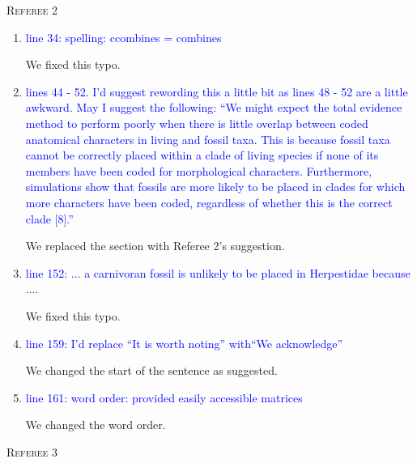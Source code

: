 \documentclass[12pt,letterpaper]{article}
\renewcommand{\section}[1]{%
\bigskip
\begin{center}
\begin{Large}
\normalfont\scshape #1
\medskip
\end{Large}
\end{center}}
\begin{document}
\section{Referee 2}

\begin{enumerate}
\item{\textcolor{blue}{line 34: spelling: ccombines = combines}}

We fixed this typo.

\item{\textcolor{blue}{lines 44 - 52. I'd suggest rewording this a little bit as lines 48 - 52 are a little awkward. May I suggest the following:
``We might expect the total evidence method to perform poorly when there is little overlap between coded anatomical characters in living and fossil taxa. This is because fossil taxa cannot be correctly placed within a clade of living species if none of its members have been coded for morphological characters. Furthermore, simulations show that fossils are more likely to be placed in clades for which more characters have been coded, regardless of whether this is the correct clade [8].''}}

We replaced the section with Referee 2's suggestion.

\item{\textcolor{blue}{line 152: ... a carnivoran fossil is unlikely to be placed in Herpestidae because ....}}

We fixed this typo.

\item{\textcolor{blue}{line 159: I'd replace ``It is worth noting'' with``We acknowledge''}}

We changed the start of the sentence as suggested.

\item{\textcolor{blue}{line 161: word order: provided easily accessible matrices}}

We changed the word order.

\end{enumerate}


\section{Referee 3}
\end{document}
